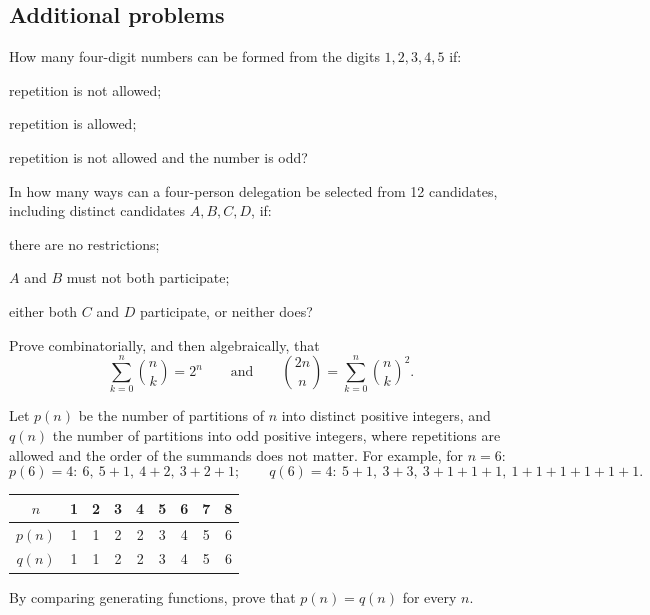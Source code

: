 \subsection*{Additional problems}
\begin{problem}
How many four-digit numbers can be formed from the digits $1,2,3,4,5$ if:
\begin{enumeratea}
  \item repetition is not allowed;
  \item repetition is allowed;
  \item repetition is not allowed and the number is odd?
\end{enumeratea}
\end{problem}
\begin{problem}
In how many ways can a four-person delegation be selected from 12 candidates,
including distinct candidates $A,B,C,D$, if:
\begin{enumeratea}
  \item there are no restrictions;
  \item $A$ and $B$ must not both participate;
  \item either both $C$ and $D$ participate, or neither does?
\end{enumeratea}
\end{problem}
\begin{problem}
Prove combinatorially, and then algebraically, that
\[
\sum_{k=0}^n\binom nk=2^n
\qquad\text{and}\qquad
\binom{2n}{n}=\sum_{k=0}^n\binom nk^2.
\]
\end{problem}
\begin{problem}
Let $p(n)$ be the number of partitions of $n$ into distinct positive integers,
and $q(n)$ the number of partitions into odd positive integers, where repetitions
are allowed and the order of the summands does not matter. For example, for $n=6$:
\[
p(6)=4:\ 6,\ 5+1,\ 4+2,\ 3+2+1; \qquad
q(6)=4:\ 5+1,\ 3+3,\ 3+1+1+1,\ 1+1+1+1+1+1.
\]
\begin{center}
\begin{tabular}{c|cccccccc}
  $n$    & 1 & 2 & 3 & 4 & 5 & 6 & 7 & 8 \\ \hline
  $p(n)$ & 1 & 1 & 2 & 2 & 3 & 4 & 5 & 6 \\
  $q(n)$ & 1 & 1 & 2 & 2 & 3 & 4 & 5 & 6
\end{tabular}
\end{center}
By comparing generating functions, prove that $p(n)=q(n)$ for every $n$.
\end{problem}
